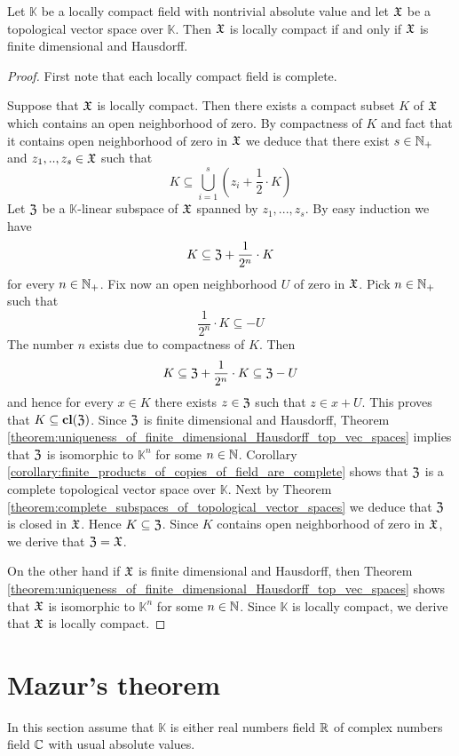 \begin{theorem}[Riesz]\label{theorem:locally_compact_hausdorff_tvs_are_finite_dimensional}
   Let $\mathbb{K}$ be a locally compact field with nontrivial absolute value and let ${\mathfrak X}$ be a topological vector space over $\mathbb{K}$. Then ${\mathfrak X}$ is locally compact if and only if ${\mathfrak X}$ is finite dimensional and Hausdorff.
\end{theorem}
\begin{proof}
   First note that each locally compact field is complete.

   Suppose that ${\mathfrak X}$ is locally compact. Then there exists a compact subset $K$ of ${\mathfrak X}$ which contains an open neighborhood of zero. By compactness of $K$ and fact that it contains open neighborhood of zero in ${\mathfrak X}$ we deduce that there exist $s \in {\mathbb N}_+$ and $z_1,..,z_s \in {\mathfrak X}$ such that
   $$K \subseteq \bigcup_{i=1}^s\left(z_i + \frac{1}{2}\cdot K\right)$$
   Let ${\mathfrak Z}$ be a $\mathbb{K}$-linear subspace of ${\mathfrak X}$ spanned by $z_1,...,z_s$. By easy induction we have
   $$K \subseteq {\mathfrak Z} + \frac{1}{2^n}\cdot K$$
   for every $n \in {\mathbb N}_+$. Fix now an open neighborhood $U$ of zero in ${\mathfrak X}$. Pick $n \in {\mathbb N}_+$ such that
   $$\frac{1}{2^n}\cdot K \subseteq -U$$
   The number $n$ exists due to compactness of $K$. Then
   $$K \subseteq {\mathfrak Z} + \frac{1}{2^n}\cdot K \subseteq {\mathfrak Z} - U$$
   and hence for every $x \in K$ there exists $z \in {\mathfrak Z}$ such that $z \in x + U$. This proves that $K \subseteq \mathbf{cl}({\mathfrak Z})$. Since ${\mathfrak Z}$ is finite dimensional and Hausdorff, Theorem \ref{theorem:uniqueness_of_finite_dimensional_Hausdorff_top_vec_spaces} implies that ${\mathfrak Z}$ is isomorphic to $\mathbb{K}^n$ for some $n \in {\mathbb N}$. Corollary \ref{corollary:finite_products_of_copies_of_field_are_complete} shows that ${\mathfrak Z}$ is a complete topological vector space over $\mathbb{K}$. Next by Theorem \ref{theorem:complete_subspaces_of_topological_vector_spaces} we deduce that ${\mathfrak Z}$ is closed in ${\mathfrak X}$. Hence $K \subseteq {\mathfrak Z}$. Since $K$ contains open neighborhood of zero in ${\mathfrak X}$, we derive that ${\mathfrak Z} = {\mathfrak X}$.

   On the other hand if ${\mathfrak X}$ is finite dimensional and Hausdorff, then Theorem \ref{theorem:uniqueness_of_finite_dimensional_Hausdorff_top_vec_spaces} shows that ${\mathfrak X}$ is isomorphic to $\mathbb{K}^n$ for some $n \in {\mathbb N}$. Since $\mathbb{K}$ is locally compact, we derive that ${\mathfrak X}$ is locally compact.
\end{proof}

\section{Mazur's theorem}
\noindent
In this section assume that $\mathbb{K}$ is either real numbers field ${\mathbb R}$ of complex numbers field ${\mathbb C}$ with usual absolute values.

